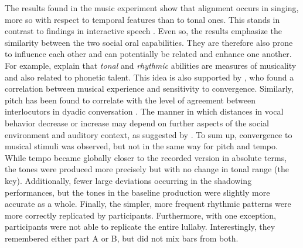 The results found in the music experiment show that alignment occurs in singing, more so with respect to temporal features than to tonal ones.
This stands in contrast to findings in interactive speech \citep[e.g.,][]{Raveh2019InterspeechAlexa}.
Even so, the results emphasize the similarity between the two social oral capabilities.
They are therefore also prone to influence each other and can potentially be related and enhance one another.
For example, \citet[][p.\ 216]{Nardo2009musicality} explain that \emph{tonal} and \emph{rhythmic} abilities are measures of musicality and also related to phonetic talent.
This idea is also supported by \citet{Tsang2018musical}, who found a correlation between musical experience and sensitivity to convergence.
Similarly, pitch has been found to correlate with the level of agreement between interlocutors in dyadic conversation \citep{Okada2012interpreting}.
The manner in which distances in vocal behavior decrease or increase may depend on further aspects of the social environment and auditory context, as suggested by \citet{Noy1999psychoanalysis}.
To sum up, convergence to musical stimuli was observed, but not in the same way for pitch and tempo.
While tempo became globally closer to the recorded version in absolute terms, the tones were produced more precisely but with no change in tonal range (the key).
Additionally, fewer large deviations occurring in the shadowing performances, but the tones in the baseline production were slightly more accurate as a whole.
Finally, the simpler, more frequent rhythmic patterns were more correctly replicated by participants.
Furthermore, with one exception, participants were not able to replicate the entire lullaby.
Interestingly, they remembered either part A or B, but did not mix bars from both.

